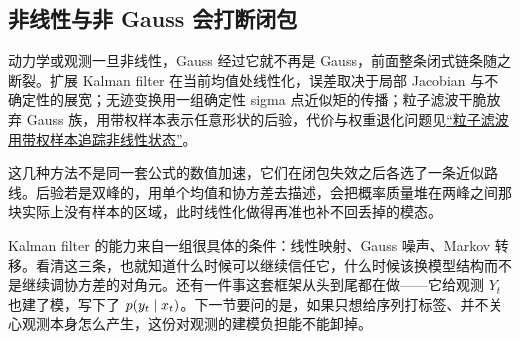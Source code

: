 \subsection{非线性与非 Gauss 会打断闭包}

动力学或观测一旦非线性，Gauss 经过它就不再是 Gauss，前面整条闭式链条随之断裂。扩展 Kalman filter 在当前均值处线性化，误差取决于局部 Jacobian 与不确定性的展宽；无迹变换用一组确定性 sigma 点近似矩的传播；粒子滤波干脆放弃 Gauss 族，用带权样本表示任意形状的后验，代价与权重退化问题见\hyperref[sec:13-Machine-Learning/08-Sampling-and-Inference/05]{``粒子滤波用带权样本追踪非线性状态''}。

这几种方法不是同一套公式的数值加速，它们在闭包失效之后各选了一条近似路线。后验若是双峰的，用单个均值和协方差去描述，会把概率质量堆在两峰之间那块实际上没有样本的区域，此时线性化做得再准也补不回丢掉的模态。

Kalman filter 的能力来自一组很具体的条件：线性映射、Gauss 噪声、Markov 转移。看清这三条，也就知道什么时候可以继续信任它，什么时候该换模型结构而不是继续调协方差的对角元。还有一件事这套框架从头到尾都在做——它给观测 \(Y_t\) 也建了模，写下了 \(p(y_t\mid x_t)\)。下一节要问的是，如果只想给序列打标签、并不关心观测本身怎么产生，这份对观测的建模负担能不能卸掉。
